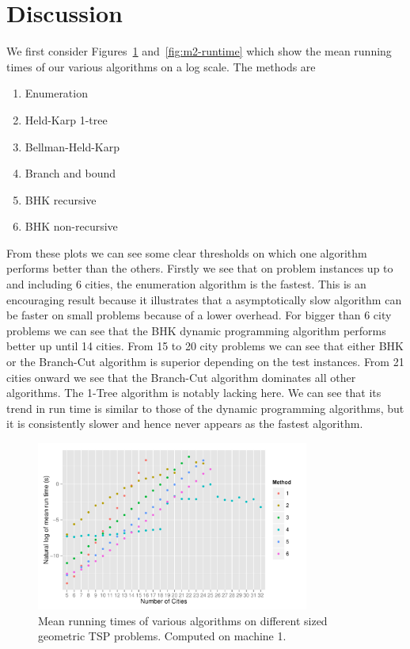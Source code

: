 \documentclass[11pt]{article}
\begin{document}
	\section{Discussion}
	\label{sec:discussion}
	We first consider Figures~\ref{fig:m1-runtime} and~\ref{fig:m2-runtime} which show the mean running times of our various algorithms on a log scale. The methods are 
	\begin{enumerate}
 \item Enumeration
 \item Held-Karp 1-tree
 \item Bellman-Held-Karp
 \item Branch and bound
 \item BHK recursive
 \item BHK non-recursive
\end{enumerate}
From these plots we can see some clear thresholds on which one algorithm performs better than the others. Firstly we see that on problem instances up to and including 6 cities, the enumeration algorithm is the fastest. This is an encouraging result because it illustrates that a asymptotically slow algorithm can be faster on small problems because of a lower overhead. For bigger than 6 city problems we can see that the BHK dynamic programming algorithm performs better up until 14 cities. From 15 to 20 city problems we can see that either BHK or the Branch-Cut algorithm is superior depending on the test instances. From 21 cities onward we see that the Branch-Cut algorithm dominates all other algorithms. The 1-Tree algorithm is notably lacking here. We can see that its trend in run time is similar to those of the dynamic programming algorithms, but it is consistently slower and hence never appears as the fastest algorithm.
	
	\begin{figure}[H]
		\center
		\includegraphics[width=0.8\textwidth]{s1-log}
		\caption{Mean running times of various algorithms on different sized geometric TSP problems. Computed on machine 1.}
		\label{fig:m1-runtime}
	\end{figure}
	
\end{document}
